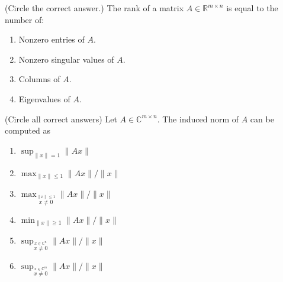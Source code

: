 \documentclass{ximera}
\begin{document}
\newpage
\begin{exercise}
    (Circle the correct answer.) The rank of a matrix $A \in \mathbb{R}^{m \times n}$
    is equal to the number of:
    \begin{enumerate}
        \item Nonzero entries of $A$.
        \item Nonzero singular values of $A$.
        \item Columns of $A$.
        \item Eigenvalues of $A$.
    \end{enumerate}
\end{exercise}

\begin{exercise}
    (Circle all correct answers)  Let $A \in \mathbb{C}^{m\times n}$.  The induced norm of $A$ can be computed as 
    \begin{enumerate}
        \item $\sup_{\|x\| = 1} \|Ax\|$
        \item $\max_{\|x\| \leq 1} \|Ax\|/\|x\|$
        \item $\max_{\stackrel{\|x\| \leq 1}{x \neq 0}}  \|Ax\|/\|x\|$
        \item $\min_{\|x\| \geq 1} \|Ax\|/\|x\|$
        \item $\sup_{\stackrel{x \in \mathbb{C}^n}{x \neq 0}} \|Ax\|/\|x\|$ 
        \item $\sup_{\stackrel{x \in \mathbb{C}^m}{x \neq 0}} \|Ax\|/\|x\|$ 
    \end{enumerate}
\end{exercise}
\end{document}
